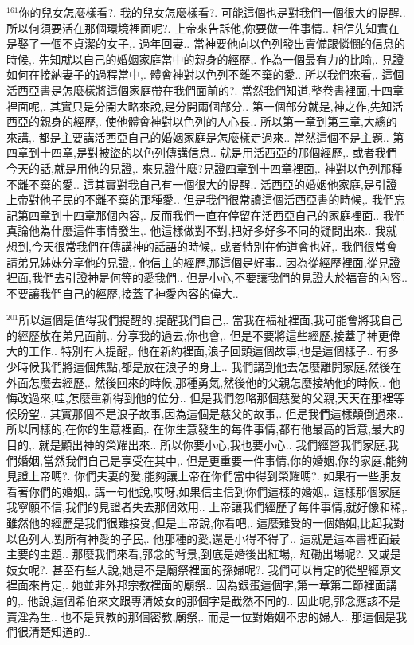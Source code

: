 \documentclass{book}
\begin{document}
$^{161}$你的兒女怎麼樣看?.
我的兒女怎麼樣看?.
可能這個也是對我們一個很大的提醒..
所以何須要活在那個環境裡面呢?.
上帝來告訴他,你要做一件事情..
相信先知實在是娶了一個不貞潔的女子,.
過年回妻..
當神要他向以色列發出責備跟憐憫的信息的時候,.
先知就以自己的婚姻家庭當中的親身的經歷,.
作為一個最有力的比喻,.
見證如何在接納妻子的過程當中,.
體會神對以色列不離不棄的愛..
所以我們來看,.
這個活西亞書是怎麼樣將這個家庭帶在我們面前的?.
當然我們知道,整卷書裡面,十四章裡面呢,.
其實只是分開大略來說,是分開兩個部分..
第一個部分就是,神之作,先知活西亞的親身的經歷,.
使他體會神對以色列的人心長..
所以第一章到第三章,大總的來講,.
都是主要講活西亞自己的婚姻家庭是怎麼樣走過來..
當然這個不是主題..
第四章到十四章,是對被盜的以色列傳講信息..
就是用活西亞的那個經歷,.
或者我們今天的話,就是用他的見證,.
來見證什麼?見證四章到十四章裡面,.
神對以色列那種不離不棄的愛..
這其實對我自己有一個很大的提醒..
活西亞的婚姻他家庭,是引證上帝對他子民的不離不棄的那種愛..
但是我們很常讀這個活西亞書的時候,.
我們忘記第四章到十四章那個內容,.
反而我們一直在停留在活西亞自己的家庭裡面..
我們真論他為什麼這件事情發生,.
他這樣做對不對,把好多好多不同的疑問出來..
我就想到,今天很常我們在傳講神的話語的時候,.
或者特別在佈道會也好,.
我們很常會請弟兄姊妹分享他的見證,.
他信主的經歷,那這個是好事..
因為從經歷裡面,從見證裡面,我們去引證神是何等的愛我們..
但是小心,不要讓我們的見證大於福音的內容..
不要讓我們自己的經歷,接蓋了神愛內容的偉大..

$^{201}$所以這個是值得我們提醒的,提醒我們自己,.
當我在福祉裡面,我可能會將我自己的經歷放在弟兄面前,.
分享我的過去,你也會,.
但是不要將這些經歷,接蓋了神更偉大的工作..
特別有人提醒,.
他在新約裡面,浪子回頭這個故事,也是這個樣子..
有多少時候我們將這個焦點,都是放在浪子的身上..
我們講到他去怎麼離開家庭,然後在外面怎麼去經歷,.
然後回來的時候,那種勇氣,然後他的父親怎麼接納他的時候,.
他悔改過來,哇,怎麼重新得到他的位分..
但是我們忽略那個慈愛的父親,天天在那裡等候盼望..
其實那個不是浪子故事,因為這個是慈父的故事,.
但是我們這樣顛倒過來..
所以同樣的,在你的生意裡面,.
在你生意發生的每件事情,都有他最高的旨意,最大的目的,.
就是顯出神的榮耀出來..
所以你要小心,我也要小心..
我們經營我們家庭,我們婚姻,當然我們自己是享受在其中,.
但是更重要一件事情,你的婚姻,你的家庭,能夠見證上帝嗎?.
你們夫妻的愛,能夠讓上帝在你們當中得到榮耀嗎?.
如果有一些朋友看著你們的婚姻,.
講一句他說,哎呀,如果信主信到你們這樣的婚姻,.
這樣那個家庭我寧願不信,我們的見證者失去那個效用..
上帝讓我們經歷了每件事情,就好像和稀,.
雖然他的經歷是我們很難接受,但是上帝說,你看吧,.
這麼難受的一個婚姻,比起我對以色列人,對所有神愛的子民,.
他那種的愛,還是小得不得了..
這就是這本書裡面最主要的主題..
那麼我們來看,郭念的背景,到底是婚後出紅場,.
紅磡出場呢?.
又或是妓女呢?.
甚至有些人說,她是不是廟祭裡面的孫婦呢?.
我們可以肯定的從聖經原文裡面來肯定,.
她並非外邦宗教裡面的廟祭..
因為銀蛋這個字,第一章第二節裡面講的,.
他說,這個希伯來文跟專清妓女的那個字是截然不同的..
因此呢,郭念應該不是賣淫為生,.
也不是異教的那個密教,廟祭,.
而是一位對婚姻不忠的婦人..
那這個是我們很清楚知道的..
\end{document}
